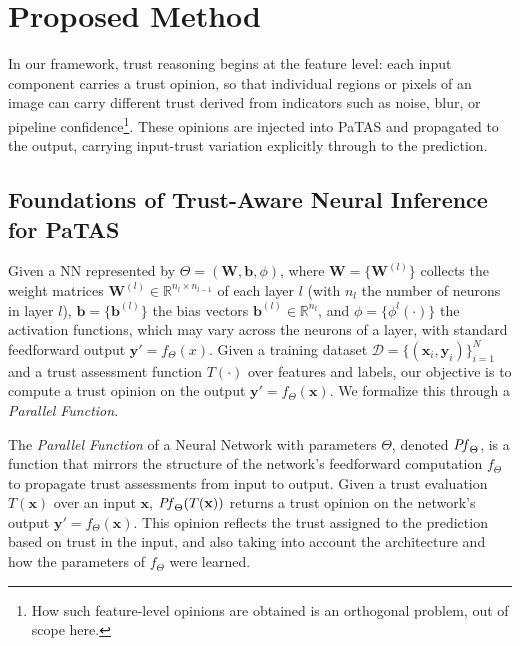 \vspace{-0.5em}
\section{Proposed Method}\label{sec:method}
In our framework, trust reasoning begins at the feature level: each input component carries a trust opinion, so that individual regions or pixels of an image can carry different trust derived from indicators such as noise, blur, or pipeline confidence\footnote{How such feature-level opinions are obtained is an orthogonal problem, out of scope here.}. These opinions are injected into PaTAS and propagated to the output, carrying input-trust variation explicitly through to the prediction.

\vspace{-0.5em}
\subsection{Foundations of Trust-Aware Neural Inference for PaTAS}
Given a NN represented by \(\Theta = \left(\mathbf{W}, \mathbf{b}, \phi\right)\), where \(\mathbf{W} = \{\mathbf{W}^{(l)}\}\) collects the weight matrices \(\mathbf{W}^{(l)} \in \mathbb{R}^{n_l \times n_{l-1}}\) of each layer \(l\) (with \(n_l\) the number of neurons in layer \(l\)), \(\mathbf{b} = \{\mathbf{b}^{(l)}\}\) the bias vectors \(\mathbf{b}^{(l)} \in \mathbb{R}^{n_l}\), and \(\phi = \{\phi^l(\cdot)\}\) the activation functions, which may vary across the neurons of a layer,
with standard feedforward output \(\mathbf{y\prime} = f_\Theta(x)\). Given a training dataset \( \mathcal{D} = \{ (\mathbf{x}_i, \mathbf{y}_i) \}_{i=1}^{N} \) and a trust assessment function \( T(\cdot) \) over features and labels, our objective is to compute a trust opinion on the output \( \mathbf{y\prime} = f_\Theta(\mathbf{x}) \). We formalize this through a \emph{Parallel Function}.

\begin{definition}
The \emph{Parallel Function} of a Neural Network with parameters \(\Theta\), denoted \( \mathit{Pf}_\Theta \), is a function that mirrors the structure of the network’s feedforward computation \( f_\Theta \) to propagate trust assessments from input to output. Given a trust evaluation \( T(\mathbf{x}) \) over an input \(\mathbf{x}\), \( \mathit{Pf}_\Theta(T(\mathbf{x})) \) returns a trust opinion on the network’s output \(\mathbf{y\prime} = f_\Theta(\mathbf{x})\). This opinion reflects the trust assigned to the prediction based on trust in the input, and also taking into account the architecture and how the parameters of \( f_\Theta \) were learned.
\end{definition}


